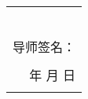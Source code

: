 \begin{table}[H]
\begin{tabular}{|rrrrrr|}
    \multicolumn{6}{|r|}{} \\
    \multicolumn{6}{|r|}{} \\
    \multicolumn{6}{|r|}{} \\
    \multicolumn{6}{|r|}{} \\
    \multicolumn{6}{|r|}{} \\
    \multicolumn{6}{|r|}{} \\
    \multicolumn{6}{|p{35.88em}|}{                                                                             \hfill 导师签名：\qquad\qquad\qquad\qquad\qquad\qquad\qquad\qquad } \\
    \multicolumn{6}{|r|}{} \\
    \multicolumn{6}{|p{35.88em}|}{\hfill 年 \qquad\quad 月 \qquad\quad 日 \qquad\qquad\qquad} \\
    \multicolumn{6}{|r|}{} \\
    \hline
    \end{tabular}
\end{table}

\renewcommand\arraystretch{1}
\restoregeometry